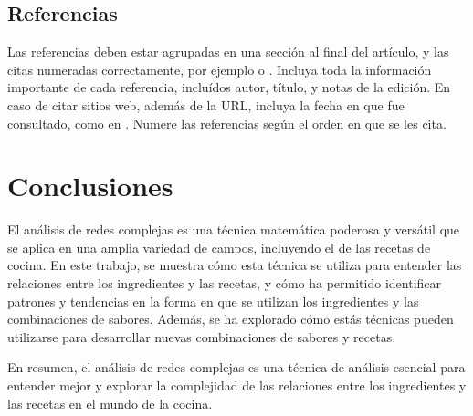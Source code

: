 \documentclass[a4paper]{article}
\begin{document}
	\subsection{Referencias}
  	Las referencias deben estar agrupadas en una sección al final del artículo,
  	y las citas numeradas correctamente, por ejemplo \cite{knuth} o \cite{goedel}.
  	Incluya toda la información importante de cada referencia, incluídos autor,
  	título, y notas de la edición. En caso de citar sitios web, además
  	de la URL, incluya la fecha en que fue consultado, como en \cite{wiki}. Numere 
  	las referencias según el orden en que se les cita.




\section{Conclusiones}\label{sec:conc}

El análisis de redes complejas es una técnica matemática poderosa y versátil que
se aplica en una amplia variedad de campos, incluyendo el de las recetas de
cocina. En este trabajo, se muestra cómo esta técnica se utiliza para entender
las relaciones entre los ingredientes y las recetas, y cómo ha permitido
identificar patrones y tendencias en la forma en que se utilizan los
ingredientes y las combinaciones de sabores. Además, se ha explorado cómo estás
técnicas pueden utilizarse para desarrollar nuevas combinaciones de sabores y
recetas.

En resumen, el análisis de redes complejas es una técnica de análisis esencial
para entender mejor y explorar la complejidad de las relaciones entre los
ingredientes y las recetas en el mundo de la cocina.




\end{document}
